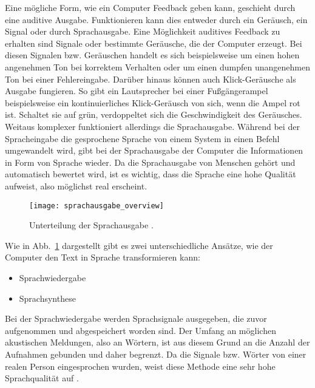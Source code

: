 Eine mögliche Form, wie ein Computer Feedback geben kann, geschieht durch eine auditive Ausgabe. Funktionieren kann dies entweder durch ein Geräusch, ein Signal oder durch Sprachausgabe.
\newline \newline
Eine Möglichkeit auditives Feedback zu erhalten sind Signale oder bestimmte Geräusche, die der Computer erzeugt. Bei diesen Signalen bzw. Geräuschen handelt es sich beispielsweise um einen hohen angenehmen Ton bei korrektem Verhalten oder um einen dumpfen unangenehmen Ton bei einer Fehlereingabe. Darüber hinaus können auch \zB Klick-Geräusche als Ausgabe fungieren. So gibt ein Lautsprecher bei einer Fußgängerampel beispielsweise ein kontinuierliches Klick-Geräusch von sich, wenn die Ampel rot ist. Schaltet sie auf grün, verdoppeltet sich die Geschwindigkeit des Geräusches.
\newline \newline
Weitaus komplexer funktioniert allerdings die Sprachausgabe. Während bei der Spracheingabe die gesprochene Sprache von einem System in einen Befehl umgewandelt wird, gibt bei der Sprachausgabe der Computer die Informationen in Form von Sprache wieder. Da die Sprachausgabe von Menschen gehört und automatisch bewertet wird, ist es wichtig, dass die Sprache eine hohe Qualität aufweist, also möglichst real erscheint. 
\begin{figure}
\centering
\texttt{[image: sprachausgabe\_overview]}
\caption{Unterteilung der Sprachausgabe \cite{FellbaumSprache}.}
\label{fig:SprachausgabeOverview}
\end{figure}
\newline \newline
Wie in Abb.~\ref{fig:SprachausgabeOverview} dargestellt gibt es zwei unterschiedliche Ansätze, wie der Computer den Text in Sprache transformieren kann:
\begin{itemize}
      \item Sprachwiedergabe
      \item Sprachsynthese
\end{itemize}
\vspace{\baselineskip}
Bei der Sprachwiedergabe werden Sprachsignale ausgegeben, die zuvor aufgenommen und abgespeichert worden sind. Der Umfang an möglichen akustischen Meldungen, also an Wörtern, ist aus diesem Grund an die Anzahl der Aufnahmen gebunden und daher begrenzt. Da die Signale bzw. Wörter von einer realen Person eingesprochen wurden, weist diese Methode eine sehr hohe Sprachqualität auf \cite{KaufmannPfisterSprache}.
